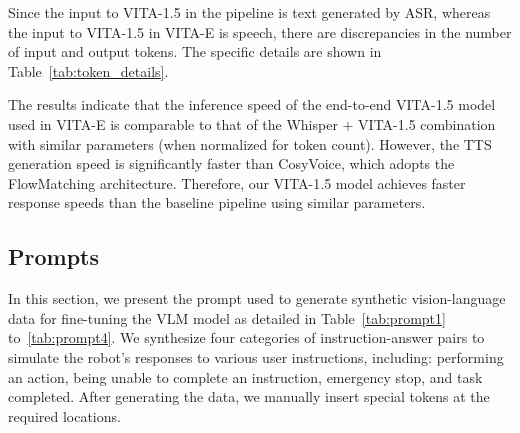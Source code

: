 \begin{table}[htbp]
    \centering
    \caption{Voice response latency comparison.}
    \label{tab:latency_comparison}
\end{table}

\begin{table}[H]
    \centering
    \caption{Details of VITA-1.5 VLM inference token count.}
    \label{tab:token_details}
\end{table}

Since the input to VITA-1.5 in the pipeline is text generated by ASR, whereas the input to VITA-1.5 in VITA-E is speech, there are discrepancies in the number of input and output tokens. The specific details are shown in Table~\ref{tab:token_details}.

The results indicate that the inference speed of the end-to-end VITA-1.5 model used in VITA-E is comparable to that of the Whisper + VITA-1.5 combination with similar parameters (when normalized for token count). However, the TTS generation speed is significantly faster than CosyVoice, which adopts the FlowMatching architecture. Therefore, our VITA-1.5 model achieves faster response speeds than the baseline pipeline using similar parameters.

\subsection{Prompts}
In this section, we present the prompt used to generate synthetic vision-language data for fine-tuning the VLM model as detailed in Table~\ref{tab:prompt1} to~\ref{tab:prompt4}. We synthesize four categories of instruction-answer pairs to simulate the robot's responses to various user instructions, including: performing an action, being unable to complete an instruction, emergency stop, and task completed. After generating the data, we manually insert special tokens at the required locations.


